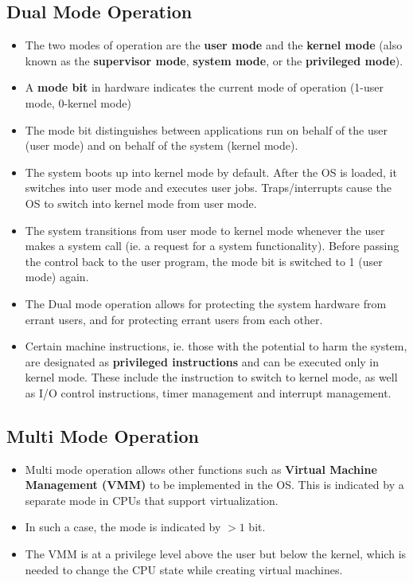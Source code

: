\documentclass{article}
\theoremstyle{plain}
\theoremstyle{definition}
\begin{document}
\subsection{Dual Mode Operation}
\begin{itemize}
    \item The two modes of operation are the \textbf{user mode} and the \textbf{kernel mode} (also known as the \textbf{supervisor mode}, \textbf{system mode}, or the \textbf{privileged mode}). 
    
    \item A \textbf{mode bit} in hardware indicates the current mode of operation (1-user mode, 0-kernel mode)
    
    \item The mode bit distinguishes between applications run on behalf of the user (user mode) and on behalf of the system (kernel mode). 
    
    \item The system boots up into kernel mode by default. After the OS is loaded, it switches into user mode and executes user jobs. Traps/interrupts cause the OS to switch into kernel mode from user mode. 
    
    \item The system transitions from user mode to kernel mode whenever the user makes a system call (ie. a request for a system functionality). Before passing the control back to the user program, the mode bit is switched to 1 (user mode) again. 
    
    \item The Dual mode operation allows for protecting the system hardware from errant users, and for protecting errant users from each other. 
    
    \item Certain machine instructions, ie. those with the potential to harm the system, are designated as \textbf{privileged instructions} and can be executed only in kernel mode. These include the instruction to switch to kernel mode, as well as I/O control instructions, timer management and interrupt management. 
\end{itemize}

\subsection{Multi Mode Operation}

\begin{itemize}
    \item Multi mode operation allows other functions such as \textbf{Virtual Machine Management (VMM)} to be implemented in the OS. This is indicated by a separate mode in CPUs that support virtualization.
    
    \item In such a case, the mode is indicated by $> 1$ bit.
    
    \item The VMM is at a privilege level above the user but below the kernel, which is needed to change the CPU state while creating virtual machines. 
\end{itemize}
\end{document}
